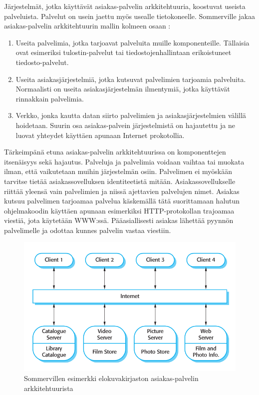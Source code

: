 \documentclass[utf8]{gradu3}
\begin{document}
Järjestelmät, jotka käyttävät asiakas-palvelin arkkitehtuuria, koostuvat useista palveluista. Palvelut on usein jaettu myös usealle tietokoneelle. Sommerville jakaa asiakas-palvelin arkkitehtuurin mallin kolmeen osaan \parencite[s. 161]{Sommerville}: 

\begin{enumerate}  
\item Useita palvelimia, jotka tarjoavat palveluita muille komponenteille. Tällaisia ovat esimeriksi tulostin-palvelut tai tiedostojenhallintaan erikoistuneet tiedosto-palvelut.
\item Useita asiakasjärjestelmiä, jotka kutsuvat palvelimien tarjoamia palveluita. Normaalisti on useita asiakasjärjestelmän ilmentymiä, jotka käyttävät rinnakkain palvelimia.
\item Verkko, jonka kautta datan siirto palvelimien ja asiakasjärjestelmien välillä hoidetaan. Suurin osa asiakas-palvein järjestelmistä on hajautettu ja ne luovat yhteydet käyttäen apunaan Internet prokotollia.
\end{enumerate}

Tärkeimpänä etuna asiakas-palvelin arkkitehtuurissa on komponenttejen itsenäisyys sekä hajautus. Palveluja ja palvelimia voidaan vaihtaa tai muokata ilman, että vaikutetaan muihin järjestelmän osiin. Palvelimen ei myöskään tarvitse tietää asiakassovelluksen identiteetistä mitään. Asiakassovellukselle riittää yleensä vain palvelimien ja niissä ajettavien palvelujen nimet. Asiakas kutsuu palvelimen tarjoamaa palvelua käskemällä tätä suorittamaan halutun ohjelmakoodin käyttäen apunaan esimerkiksi HTTP-protokollan trajoamaa viestiä, jota käytetään WWW:ssä. Pääasiallisesti asiakas lähettää pyynnön palvelimelle ja odottaa kunnes palvelin vastaa viestiin.

\begin{figure}[h]
\centering
\includegraphics[scale=0.85]{clientserver.png}
\caption{Sommervillen esimerkki elokuvakirjaston asiakas-palvelin arkkitehtuurista \parencite[s.162]{Sommerville}}
\end{figure}
\end{document}
